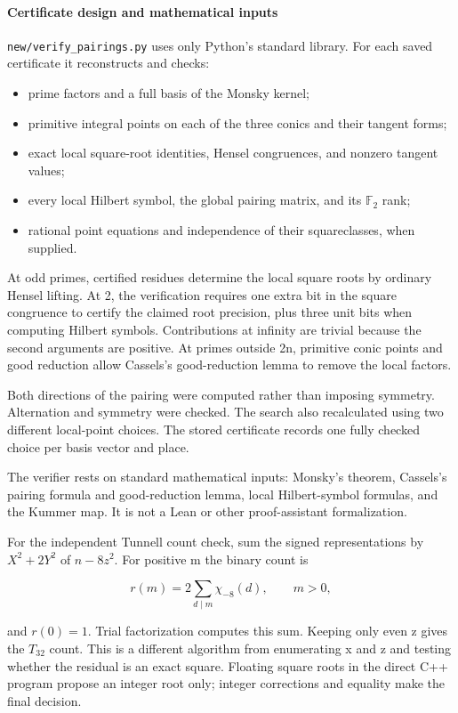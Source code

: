 \documentclass[11pt]{article}
\newcommand{\tightlist}{\setlength{\itemsep}{0pt}\setlength{\parskip}{0pt}}
\begin{document}
\paragraph{Certificate design and mathematical inputs}

\nolinkurl{new/verify_pairings.py} uses only Python's standard library. For each saved certificate it reconstructs and checks:

\begin{itemize}
\tightlist
\item
  prime factors and a full basis of the Monsky kernel;
\item
  primitive integral points on each of the three conics and their tangent forms;
\item
  exact local square-root identities, Hensel congruences, and nonzero tangent values;
\item
  every local Hilbert symbol, the global pairing matrix, and its \(\mathbb F_2\) rank;
\item
  rational point equations and independence of their squareclasses, when supplied.
\end{itemize}

At odd primes, certified residues determine the local square roots by ordinary Hensel lifting. At 2, the verification requires one extra bit in the square congruence to certify the claimed root precision, plus three unit bits when computing Hilbert symbols. Contributions at infinity are trivial because the second arguments are positive. At primes outside 2n, primitive conic points and good reduction allow Cassels's good-reduction lemma to remove the local factors.

Both directions of the pairing were computed rather than imposing symmetry. Alternation and symmetry were checked. The search also recalculated using two different local-point choices. The stored certificate records one fully checked choice per basis vector and place.

The verifier rests on standard mathematical inputs: Monsky's theorem, Cassels's pairing formula and good-reduction lemma, local Hilbert-symbol formulas, and the Kummer map. It is not a Lean or other proof-assistant formalization.

For the independent Tunnell count check, sum the signed representations by \(X^2+2Y^2\) of \(n-8z^2\). For positive m the binary count is

\[r(m)=2\sum_{d\mid m}\chi_{-8}(d),\qquad m>0,\]

and \(r(0)=1\). Trial factorization computes this sum. Keeping only even z gives the \(T_{32}\) count. This is a different algorithm from enumerating x and z and testing whether the residual is an exact square. Floating square roots in the direct C++ program propose an integer root only; integer corrections and equality make the final decision.
\end{document}
